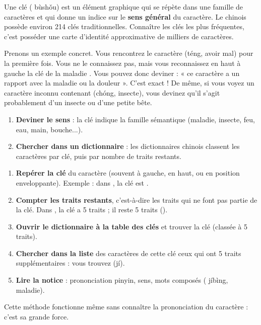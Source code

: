 \documentclass[11pt]{article}
\newcommand{\cle}[1]{{\popxbold\color{popdark}#1}}
\newcommand{\zh}[1]{\ifmmode\text{#1}\else{#1}\fi}
\begin{document}
\begin{definition}
Une \cle{clé} (\zh{部首} bùshǒu) est un élément graphique qui se répète dans une famille de caractères et qui donne un indice sur le \textbf{sens général} du caractère. Le chinois possède environ 214 clés traditionnelles. Connaître les clés les plus fréquentes, c'est posséder une carte d'identité approximative de milliers de caractères.
\end{definition}

Prenons un exemple concret. Vous rencontrez le caractère \zh{疼} (téng, avoir mal) pour la première fois. Vous ne le connaissez pas, mais vous reconnaissez en haut à gauche la clé de la maladie \zh{疒}. Vous pouvez donc deviner : « ce caractère a un rapport avec la maladie ou la douleur ». C'est exact ! De même, si vous voyez un caractère inconnu contenant \zh{虫} (chóng, insecte), vous devinez qu'il s'agit probablement d'un insecte ou d'une petite bête.

\begin{aretenir}
\begin{enumerate}
\item \textbf{Deviner le sens} : la clé indique la famille sémantique (maladie, insecte, feu, eau, main, bouche...).
\item \textbf{Chercher dans un dictionnaire} : les dictionnaires chinois classent les caractères par clé, puis par nombre de traits restants.
\end{enumerate}
\end{aretenir}

\begin{methode}
\begin{enumerate}
\item \textbf{Repérer la clé} du caractère (souvent à gauche, en haut, ou en position enveloppante). Exemple : dans \zh{疾}, la clé est \zh{疒}.
\item \textbf{Compter les traits restants}, c'est-à-dire les traits qui ne font pas partie de la clé. Dans \zh{疾}, la clé \zh{疒} a 5 traits ; il reste 5 traits (\zh{矢}).
\item \textbf{Ouvrir le dictionnaire à la table des clés} et trouver la clé \zh{疒} (classée à 5 traits).
\item \textbf{Chercher dans la liste} des caractères de cette clé ceux qui ont 5 traits supplémentaires : vous trouvez \zh{疾} (jí).
\item \textbf{Lire la notice} : prononciation pinyin, sens, mots composés (\zh{疾病} jíbìng, maladie).
\end{enumerate}
Cette méthode fonctionne même sans connaître la prononciation du caractère : c'est sa grande force.
\end{methode}
\end{document}

